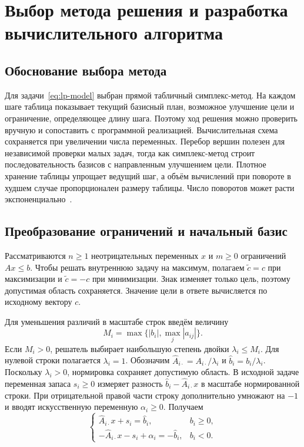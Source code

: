 \section{Выбор метода решения и разработка вычислительного алгоритма}
\label{sec:algorithm}

\subsection{Обоснование выбора метода}

Для задачи~\eqref{eq:lp-model} выбран прямой табличный симплекс-метод.
На каждом шаге таблица показывает текущий базисный план, возможное
улучшение цели и ограничение, определяющее длину шага. Поэтому ход
решения можно проверить вручную и сопоставить с программной реализацией.
Вычислительная схема сохраняется при увеличении числа переменных.
Перебор вершин полезен для независимой
проверки малых задач, тогда как симплекс-метод строит последовательность
базисов с направленным улучшением цели. Плотное хранение таблицы
упрощает ведущий шаг, а объём вычислений при повороте в худшем случае
пропорционален размеру таблицы. Число поворотов может расти
экспоненциально~\cite{vanderbei2020}.

\subsection{Преобразование ограничений и начальный базис}

Рассматриваются $n\geq 1$ неотрицательных переменных $x$ и $m\geq 0$
ограничений $Ax\leq b$. Чтобы решать внутреннюю задачу на максимум,
полагаем
$\tilde c=c$ при максимизации и $\tilde c=-c$ при минимизации.
Знак изменяет только цель, поэтому допустимая область сохраняется.
Значение цели в ответе вычисляется по исходному вектору $c$.

Для уменьшения различий в масштабе строк введём величину
\[
  M_i=\max\bigl\{|b_i|,\max_j |a_{ij}|\bigr\}.
\]
Если $M_i>0$, решатель выбирает наибольшую степень двойки
$\lambda_i\leq M_i$. Для нулевой строки полагается $\lambda_i=1$.
Обозначим $\widehat A_{i\cdot}=A_{i\cdot}/\lambda_i$ и
$\widehat b_i=b_i/\lambda_i$. Поскольку $\lambda_i>0$, нормировка
сохраняет допустимую область. В исходной задаче переменная запаса
$s_i\geq0$ измеряет разность $\widehat b_i-\widehat A_{i\cdot}x$
в масштабе нормированной строки.
При отрицательной правой части строку дополнительно умножают на $-1$
и вводят искусственную переменную $\alpha_i\geq 0$. Получаем
\begin{equation}
  \begin{cases}
    \widehat A_{i\cdot}x+s_i=\widehat b_i, & b_i\geq 0,\\
    -\widehat A_{i\cdot}x-s_i+\alpha_i=-\widehat b_i, & b_i<0.
  \end{cases}
  \label{eq:simplex-augmented-system}
\end{equation}

